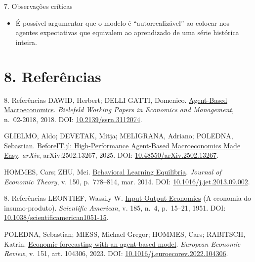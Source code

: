 \documentclass[aspectratio=169,11pt]{beamer}
\providecommand{\tightlist}{\setlength{\itemsep}{0pt}\setlength{\parskip}{0pt}}
\begin{document}
\begin{frame}[allowframebreaks]{7. Observações críticas}
\normalsize
\begin{itemize}
\tightlist
\item
  É possível argumentar que o modelo é ``autorrealizável'' ao colocar nos agentes expectativas que equivalem ao aprendizado de uma série histórica inteira.
\end{itemize}
\end{frame}


\section{8. Referências}

\begin{frame}[allowframebreaks]{8. Referências}
\normalsize
DAWID, Herbert; DELLI GATTI, Domenico. \href{https://papers.ssrn.com/sol3/papers.cfm?abstract_id=3112074}{Agent-Based Macroeconomics}. \emph{Bielefeld Working Papers in Economics and Management}, n.~02-2018, 2018. DOI: \href{https://doi.org/10.2139/ssrn.3112074}{10.2139/ssrn.3112074}.

GLIELMO, Aldo; DEVETAK, Mitja; MELIGRANA, Adriano; POLEDNA, Sebastian. \href{https://arxiv.org/abs/2502.13267}{BeforeIT.jl: High-Performance Agent-Based Macroeconomics Made Easy}. \emph{arXiv}, arXiv:2502.13267, 2025. DOI: \href{https://doi.org/10.48550/arXiv.2502.13267}{10.48550/arXiv.2502.13267}.

HOMMES, Cars; ZHU, Mei. \href{https://doi.org/10.1016/j.jet.2013.09.002}{Behavioral Learning Equilibria}. \emph{Journal of Economic Theory}, v. 150, p.~778--814, mar. 2014. DOI: \href{https://doi.org/10.1016/j.jet.2013.09.002}{10.1016/j.jet.2013.09.002}.
\end{frame}


\begin{frame}[allowframebreaks]{8. Referências}
\normalsize
LEONTIEF, Wassily W. \href{https://www.scientificamerican.com/article/input-output-economics/}{Input-Output Economics} (A economia do insumo-produto). \emph{Scientific American}, v. 185, n.~4, p.~15--21, 1951. DOI: \href{https://doi.org/10.1038/scientificamerican1051-15}{10.1038/scientificamerican1051-15}.

POLEDNA, Sebastian; MIESS, Michael Gregor; HOMMES, Cars; RABITSCH, Katrin. \href{https://www.sciencedirect.com/science/article/pii/S0014292122001891}{Economic forecasting with an agent-based model}. \emph{European Economic Review}, v. 151, art. 104306, 2023. DOI: \href{https://doi.org/10.1016/j.euroecorev.2022.104306}{10.1016/j.euroecorev.2022.104306}.
\end{frame}
\end{document}
